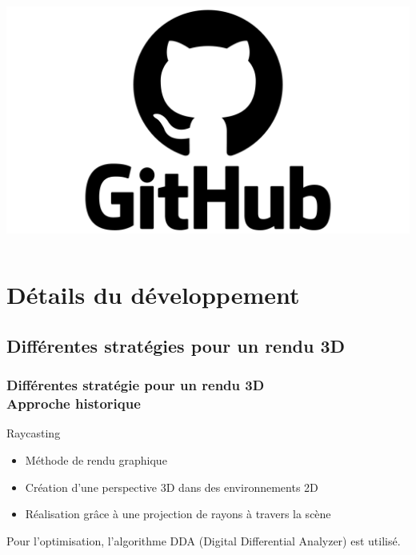 \documentclass{beamer}
\begin{document}
\begin{frame}
\begin{columns}
        \centering
        \includegraphics[width=\textwidth]{images/github.png}
    \end{columns}
\end{frame}

\section{Détails du développement}
\subsection{Différentes stratégies pour un rendu 3D}

\begin{frame}
    \frametitle{Différentes stratégie pour un rendu 3D \\
                \small Approche historique}
    \begin{block}{Raycasting}
        \begin{itemize}
            \item Méthode de rendu graphique
            \item Création d'une perspective 3D dans des environnements 2D
            \item Réalisation grâce à une projection de rayons à travers la scène
        \end{itemize}
    \end{block}
    \begin{block}{}
        Pour l'optimisation, l'algorithme DDA (Digital Differential Analyzer) est utilisé.
    \end{block}
\end{frame}
\end{document}
